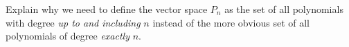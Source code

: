%
Explain why we need to define the vector space $P_n$ as the set of all polynomials with degree {\em up to and including} $n$ instead of the more obvious set of all polynomials of degree {\em exactly} $n$.